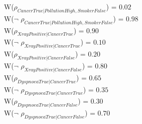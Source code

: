 W($\rho_{CancerTrue|PollutionHigh,SmokerFalse}$) = $0.02$\\ 
W($\neg$ $\rho_{CancerTrue|PollutionHigh,SmokerFalse}$) = $0.98$\\ 
W($\rho_{XrayPositive|CancerTrue}$) = $0.90$\\ 
W($\neg$ $\rho_{XrayPositive|CancerTrue}$) = $0.10$\\ 
W($\rho_{XrayPositive|CancerFalse}$) = $0.20$\\ 
W($\neg$ $\rho_{XrayPositive|CancerFalse}$) = $0.80$\\ 
W($\rho_{DyspnoeaTrue|CancerTrue}$) = $0.65$\\ 
W($\neg$ $\rho_{DyspnoeaTrue|CancerTrue}$) = $0.35$\\ 
W($\rho_{DyspnoeaTrue|CancerFalse}$) = $0.30$\\ 
W($\neg$ $\rho_{DyspnoeaTrue|CancerFalse}$) = $0.70$\\ 

